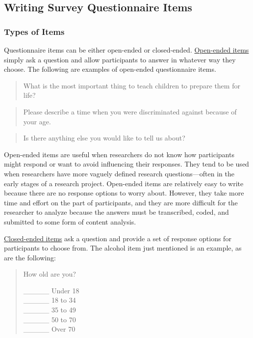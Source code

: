 \documentclass[
]{krantz}
\begin{document}
\subsection*{Writing Survey Questionnaire Items}\label{writing-survey-questionnaire-items}


\subsubsection*{Types of Items}\label{types-of-items}


Questionnaire items can be either open-ended or closed-ended. \hyperref[open-ended-item]{Open-ended items} simply ask a question and allow participants to answer in whatever way they choose. The following are examples of open-ended questionnaire items.

\begin{quote}
What is the most important thing to teach children to prepare them for life?
\end{quote}

\begin{quote}
Please describe a time when you were discriminated against because of your age.
\end{quote}

\begin{quote}
Is there anything else you would like to tell us about?
\end{quote}

Open-ended items are useful when researchers do not know how participants might respond or want to avoid influencing their responses. They tend to be used when researchers have more vaguely defined research questions---often in the early stages of a research project. Open-ended items are relatively easy to write because there are no response options to worry about. However, they take more time and effort on the part of participants, and they are more difficult for the researcher to analyze because the answers must be transcribed, coded, and submitted to some form of content analysis.

\hyperref[closed-endedux5cux2520item]{Closed-ended items} ask a question and provide a set of response options for participants to choose from. The alcohol item just mentioned is an example, as are the following:

\begin{quote}
How old are you?

\_\_\_\_\_ Under 18\\
\_\_\_\_\_ 18 to 34\\
\_\_\_\_\_ 35 to 49\\
\_\_\_\_\_ 50 to 70\\
\_\_\_\_\_ Over 70
\end{quote}
\end{document}
